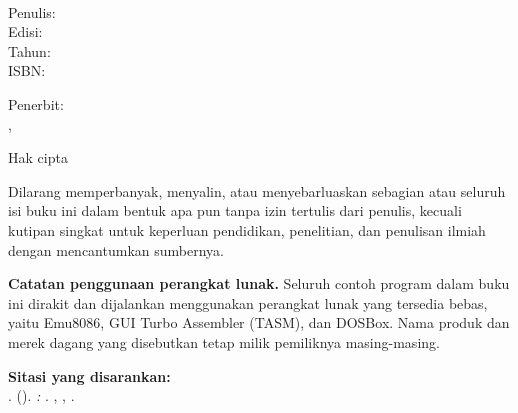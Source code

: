 
\thispagestyle{empty}

\vspace*{\fill}

\noindent
{\bfseries\BookTitle}\\
{\itshape\BookSubtitle}

\vspace{0.6cm}

\noindent
Penulis: \BookAuthor\\
Edisi: \BookEdition\\
Tahun: \BookYear\\
ISBN: \BookISBN

\vspace{0.6cm}

\noindent
Penerbit:\\
\BookProgram, \BookFaculty\\
\BookInstitution

\vspace{0.6cm}

\noindent
Hak cipta \textcopyright\ \BookYear\ \BookAuthor

\vspace{0.4cm}

\noindent
Dilarang memperbanyak, menyalin, atau menyebarluaskan sebagian atau
seluruh isi buku ini dalam bentuk apa pun tanpa izin tertulis dari
penulis, kecuali kutipan singkat untuk keperluan pendidikan,
penelitian, dan penulisan ilmiah dengan mencantumkan sumbernya.

\vspace{0.6cm}

\noindent
\textbf{Catatan penggunaan perangkat lunak.} Seluruh contoh program
dalam buku ini dirakit dan dijalankan menggunakan perangkat lunak
yang tersedia bebas, yaitu Emu8086, GUI Turbo Assembler (TASM), dan
DOSBox. Nama produk dan merek dagang yang disebutkan tetap milik
pemiliknya masing-masing.

\vspace{0.6cm}

\noindent
\textbf{Sitasi yang disarankan:}\\
\BookAuthorShort. (\BookYear). \textit{\BookTitle: \BookSubtitle}.
\BookProgram, \BookFaculty, \BookInstitution.

\vspace*{\fill}

\clearpage
